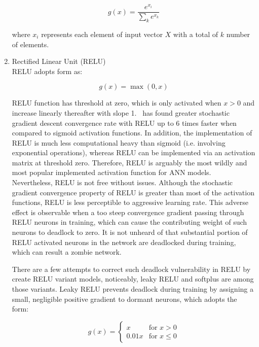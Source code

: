 \begin{enumerate}
\begin{equation}
    g(x) = \frac{e^{x_i}} {\sum_k e^{x_k}}
\end{equation}

where $x_i$ represents each element of input vector $X$ with a total of $k$ number of elements. 

\item Rectified Linear Unit (RELU) \\
RELU adopts form as:

\begin{equation}
    g(x) = \max(0,x)
\end{equation}

RELU function has threshold at zero, which is only activated when $x > 0$ and increase linearly thereafter with slope 1.~\citet{Krizhevsky_2017} has found greater stochastic gradient descent convergence rate with RELU up to 6 times faster when compared to sigmoid activation functions. In addition, the implementation of RELU is much less computational heavy than sigmoid (i.e. involving exponential operations), whereas RELU can be implemented via an activation matrix at threshold zero. Therefore, RELU is arguably the most wildly and most popular implemented activation function for ANN models.~\cite{Bengio_2012,Toth_2013,Jaitly_2011,nga,LeCun_2015,}  Nevertheless, RELU is not free without issues. Although the stochastic gradient convergence property of RELU is greater than most of the activation functions, RELU is less perceptible to aggressive learning rate. This adverse effect is observable when a too steep convergence gradient passing through RELU neurons in training, which can cause the contributing weight of such neurons to deadlock to zero. It is not unheard of that substantial portion of RELU activated neurons in the network are deadlocked during training, which can result a zombie network. 
\par 
There are a few attempts to correct such deadlock vulnerability in RELU by create RELU variant models, noticeably, leaky RELU and softplus are among those variants. Leaky RELU prevents deadlock during training by assigning a small, negligible positive gradient to dormant neurons, which adopts the form: 

\begin{equation}
    g(x) = \left\{ 
    \begin{array}{lr}
        x & \text{for } x > 0 \\
        0.01x & \text{for } x\leq 0
    \end{array}\right.
\end{equation}


\end{enumerate}
